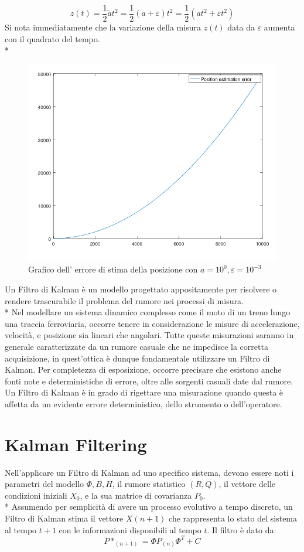 $$
z(t) = \frac{1}{2} \tilde{a} t^2 = \frac{1}{2}(a + \varepsilon) t^2 = \frac{1}{2} \left(at^2 + \varepsilon t^2\right)
$$
Si nota immediatamente che la variazione della misura $z(t)$ data da $\varepsilon$ aumenta con il quadrato del tempo.\\*
\begin{figure}[h]
	\centering
	\includegraphics[scale=0.5]{img/errormeas}
	\caption{Grafico dell' errore di stima della posizione con $a = 10^0, \varepsilon = 10^{-3}$}
	\label{fig:errormeas}
\end{figure}
\noindent{}Un Filtro di Kalman \`e un modello progettato appositamente per risolvere o rendere trascurabile il problema del rumore nei processi di misura.\\*
Nel modellare un sistema dinamico complesso come il moto di un treno lungo una traccia ferroviaria, occorre tenere in considerazione le misure di accelerazione, velocit\`a, e posizione sia lineari che angolari. Tutte queste misurazioni saranno in generale caratterizzate da un rumore casuale che ne impedisce la corretta acquisizione, in quest'ottica \`e dunque fondamentale utilizzare un Filtro di Kalman. Per completezza di esposizione, occorre precisare che esistono anche fonti note e deterministiche di errore, oltre alle sorgenti casuali date dal rumore. Un Filtro di Kalman \`e in grado di rigettare una misurazione quando questa \`e affetta da un evidente errore deterministico, dello strumento o dell'operatore.
\section{Kalman Filtering}
Nell'applicare un Filtro di Kalman ad uno specifico sistema, devono essere noti i parametri del modello $\Phi,B,H$, il rumore statistico $(R,Q)$, il vettore delle condizioni iniziali $X_0$, e la sua matrice di covarianza $P_0$.\\*
Assumendo per semplicit\`a di avere un processo evolutivo a tempo discreto,
un Filtro di Kalman stima il vettore $X(n+1)$ che rappresenta lo stato del sistema al tempo $t+1$ con le informazioni disponibili al tempo $t$. Il filtro \`e dato da:
$$
P*_(n+1) = \Phi P_(n)\Phi^T + C
$$